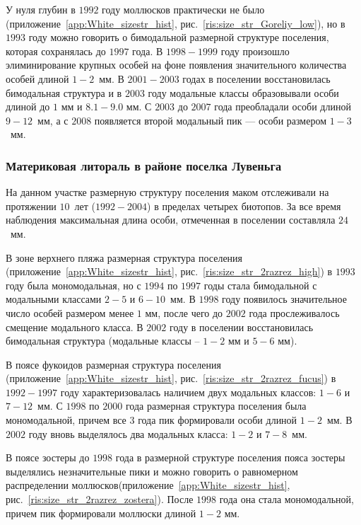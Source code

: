 У нуля глубин в $1992$ году моллюсков практически не было (приложение~\ref{app:White_sizestr_hist}, рис.~\ref{ris:size_str_Goreliy_low}), но в $1993$ году можно говорить о бимодальной размерной структуре поселения, которая сохранялась до $1997$ года. 
В $1998-1999$ году произошло элиминирование крупных особей на фоне появления значительного количества особей длиной $1-2$~мм. 
В $2001-2003$ годах в поселении восстановилась бимодальная структура и в $2003$ году модальные классы образовывали особи длиной до $1$ мм и $8.1-9.0$ мм. 
С $2003$ до $2007$ года преобладали особи длиной $9-12$~мм, а с $2008$ появляется второй модальный пик --- особи размером $1-3$~мм.


		\subsubsection*{Материковая литораль в районе поселка Лувеньга}
На данном участке размерную структуру поселения маком отслеживали на протяжении $10$~лет ($1992 - 2004$) в пределах четырех биотопов.
За все время наблюдения максимальная длина особи, отмеченная в поселении составляла $24$~мм.

В зоне верхнего пляжа размерная структура поселения (приложение~\ref{app:White_sizestr_hist}, рис.~\ref{ris:size_str_2razrez_high}) в $1993$ году была мономодальная, но с $1994$ по $1997$ годы стала бимодальной с модальными классами $2-5$ и $6-10$~мм.
В $1998$ году появилось значительное число особей размером менее $1$ мм, после чего до $2002$ года прослеживалось смещение модального класса. 
В $2002$ году в поселении восстановилась бимодальная структура (модальные классы -- $1-2$ мм и $5-6$ мм).

В поясе фукоидов размерная структура поселения (приложение~\ref{app:White_sizestr_hist}, рис.~\ref{ris:size_str_2razrez_fucus}) в $1992-1997$ году характеризовалась наличием двух модальных классов: $1-6$ и $7-12$~мм. 
С $1998$ по $2000$ года размерная структура поселения была мономодальной, причем все $3$ года пик формировали особи длиной $1-2$~мм. 
В $2002$ году вновь выделялось два модальных класса: $1-2$ и $7-8$~мм.

В поясе зостеры до $1998$ года в размерной структуре поселения пояса зостеры выделялись незначительные пики и можно говорить о равномерном распределении моллюсков(приложение~\ref{app:White_sizestr_hist}, рис.~\ref{ris:size_str_2razrez_zostera}). 
После $1998$ года она стала мономодальной, причем пик формировали моллюски длиной $1-2$ мм.


